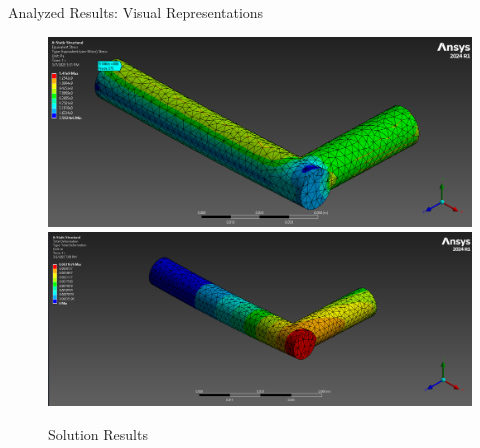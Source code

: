 \documentclass[11pt]{beamer}
\begin{document}
    \begin{frame}{Analyzed Results: Visual Representations} 
        \begin{figure}[H]
            \centering
            \includegraphics[height=0.325\textwidth]{figs/3E-3_Body_1E-3_Face/equiv_stress_cropped.png}
            \includegraphics[height=0.30\textwidth]{figs/3E-3_Body_1E-3_Face/total_deformation_cropped.png}
            \caption{Solution Results}
        \end{figure}
    \end{frame}
\end{document}
